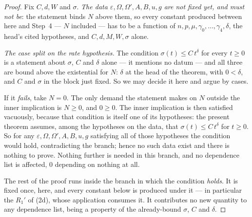 \begin{proof}
Fix $C,d,W$ and $\sigma$.  \emph{The data $\varepsilon,\Omega,\Omega',A,B,u,g$
are not fixed yet, and must not be}: the statement binds $N$ above them, so
every constant produced between here and Step~4 --- $N$ included --- has to be
a function of $n,p,\mu,\gamma_0,\dots,\gamma_4,\delta$, the head's cited
hypotheses, and $C,d,M,W,\sigma$ alone.

\emph{The case split on the rate hypothesis.}  The condition
$\sigma(t)\le C\,t^{\delta}$ for every $t\ge0$ is a statement about $\sigma$,
$C$ and $\delta$ alone --- it mentions no datum --- and all three are bound
above the existential for $N$: $\delta$ at the head of the theorem, with
$0<\delta$, and $C$ and $\sigma$ in the block just fixed.  So we may decide it
here and argue by cases.

If it \emph{fails}, take $N=0$.  The only demand the statement makes on $N$
outside the inner implication is $N\ge0$, and $0\ge0$.  The inner implication
is then satisfied vacuously, because that condition is itself one of its
hypotheses: the present theorem assumes, among the hypotheses on the data, that
$\sigma(t)\le C\,t^{\delta}$ for $t\ge0$.  So for any
$\varepsilon,\Omega,\Omega',A,B,u,g$ satisfying all of those hypotheses the
condition would hold, contradicting the branch; hence no such data exist and
there is nothing to prove.  Nothing further is needed in this branch, and no
dependence list is affected, $0$ depending on nothing at all.

The rest of the proof runs inside the branch in which the condition
\emph{holds}.  It is fixed once, here, and every constant below is produced
under it --- in particular the $R_1'$ of (2d), whose application consumes it.
It contributes no new quantity to any dependence list, being a property of the
already-bound $\sigma$, $C$ and $\delta$.


\end{proof}
